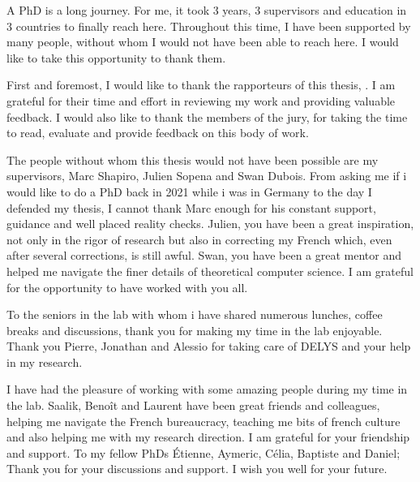 %

A PhD is a long journey. For me, it took 3 years, 3 supervisors and education in 3 countries to finally reach here. Throughout this time, I have been supported by many people, without whom I would not have been able to reach here. I would like to take this opportunity to thank them. 

First and foremost, I would like to thank the rapporteurs of this thesis, . I am grateful for their time and effort in reviewing my work and providing valuable feedback. I would also like to thank the members of the jury,  for taking the time to read, evaluate and provide feedback on this body of work. 

The people without whom this thesis would not have been possible are my supervisors, Marc Shapiro, Julien Sopena and Swan Dubois. From asking me if i would like to do a PhD back in 2021 while i was in Germany to the day I defended my thesis, I cannot thank Marc enough for his constant support, guidance and well placed reality checks. Julien, you have been a great inspiration, not only in the rigor of research but also in correcting my French which, even after several corrections, is still awful. Swan, you have been a great mentor and helped me navigate the finer details of theoretical computer science. I am grateful for the opportunity to have worked with you all.

To the seniors in the lab with whom i have shared numerous lunches, coffee breaks and discussions, thank you for making my time in the lab enjoyable. Thank you Pierre, Jonathan and Alessio for taking care of DELYS and your help in my research. 

I have had the pleasure of working with some amazing people during my time in the lab. Saalik, Benoît and Laurent have been great friends and colleagues, helping me navigate the French bureaucracy, teaching me bits of french culture and also helping me with my research direction. I am grateful for your friendship and support. To my fellow PhDs Étienne, Aymeric, Célia, Baptiste and Daniel; Thank you for your discussions and support. I wish you well for your future. 

